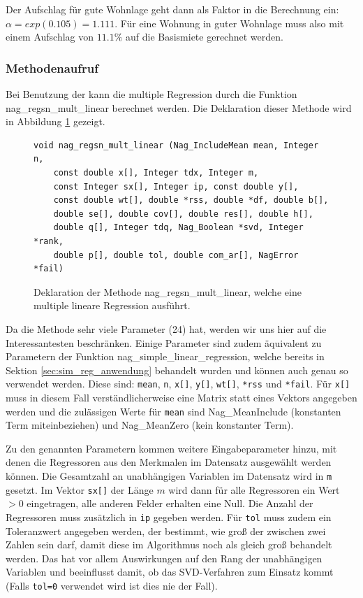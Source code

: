 Der Aufschlag für gute Wohnlage geht dann als Faktor in die Berechnung ein: $\alpha = exp(0.105) = 1.111$.
Für eine Wohnung in guter Wohnlage muss also mit einem Aufschlag von $11.1 \%$ auf die Basismiete gerechnet werden.


\subsubsection{Methodenaufruf}

Bei Benutzung der \naglib kann die multiple Regression durch die Funktion nag\_regsn\_mult\_linear berechnet werden.
Die Deklaration dieser Methode wird in Abbildung \ref{fig:nag_multiple_linear} gezeigt.
\begin{figure}[t]
  \centering
\begin{lstlisting}
void nag_regsn_mult_linear (Nag_IncludeMean mean, Integer n, 
    const double x[], Integer tdx, Integer m, 
    const Integer sx[], Integer ip, const double y[], 
    const double wt[], double *rss, double *df, double b[], 
    double se[], double cov[], double res[], double h[], 
    double q[], Integer tdq, Nag_Boolean *svd, Integer *rank, 
    double p[], double tol, double com_ar[], NagError *fail)
\end{lstlisting}
  \caption{Deklaration der Methode nag\_regsn\_mult\_linear, welche eine multiple lineare Regression ausführt.}
  \label{fig:nag_multiple_linear}
\end{figure}

Da die Methode sehr viele Parameter (24) hat, werden wir uns hier auf die Interessantesten beschränken.
Einige Parameter sind zudem äquivalent zu Parametern der Funktion nag\_simple\_linear\_regression, welche bereits in Sektion \ref{sec:sim_reg_anwendung} behandelt wurden und können auch genau so verwendet werden.
Diese sind: \lstinline{mean}, \lstinline{n}, \lstinline{x[]}, \lstinline{y[]}, \lstinline{wt[]}, \lstinline{*rss} und \lstinline{*fail}.
Für \lstinline{x[]} muss in diesem Fall verständlicherweise eine Matrix statt eines Vektors angegeben werden und die zulässigen Werte für \lstinline{mean} sind Nag\_MeanInclude (konstanten Term miteinbeziehen) und Nag\_MeanZero (kein konstanter Term).

Zu den genannten Parametern kommen weitere Eingabeparameter hinzu, mit denen die Regressoren aus den Merkmalen im Datensatz ausgewählt werden können.
Die Gesamtzahl an unabhängigen Variablen im Datensatz wird in \lstinline{m} gesetzt.
Im Vektor \lstinline{sx[]} der Länge $m$ wird dann für alle Regressoren ein Wert $>0$ eingetragen, alle anderen Felder erhalten eine Null.
Die Anzahl der Regressoren muss zusätzlich in \lstinline{ip} gegeben werden.
Für \lstinline{tol} muss zudem ein Toleranzwert angegeben werden, der bestimmt, wie groß der zwischen zwei Zahlen sein darf, damit diese im Algorithmus noch als gleich groß behandelt werden. 
Das hat vor allem Auswirkungen auf den Rang der unabhängigen Variablen und beeinflusst damit, ob das SVD-Verfahren zum Einsatz kommt (Falls \lstinline{tol=0} verwendet wird ist dies nie der Fall).

